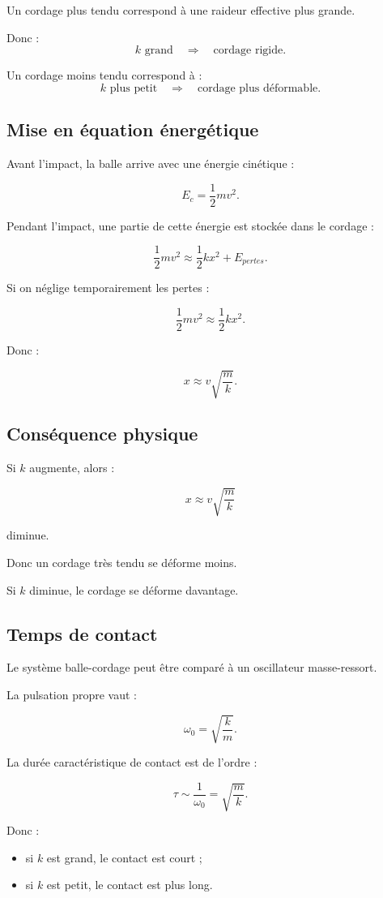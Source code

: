 \documentclass[11pt,a4paper]{article}
\begin{document}
Un cordage plus tendu correspond à une raideur effective plus grande.

Donc :
\[
k \text{ grand} \quad \Rightarrow \quad \text{cordage rigide}.
\]

Un cordage moins tendu correspond à :
\[
k \text{ plus petit} \quad \Rightarrow \quad \text{cordage plus déformable}.
\]

\subsection{Mise en équation énergétique}

Avant l'impact, la balle arrive avec une énergie cinétique :

\[
E_c=\frac12mv^2.
\]

Pendant l'impact, une partie de cette énergie est stockée dans le cordage :

\[
\frac12mv^2 \approx \frac12kx^2 + E_{pertes}.
\]

Si on néglige temporairement les pertes :

\[
\frac12mv^2 \approx \frac12kx^2.
\]

Donc :

\[
x\approx v\sqrt{\frac{m}{k}}.
\]

\subsection{Conséquence physique}

Si $k$ augmente, alors :

\[
x\approx v\sqrt{\frac{m}{k}}
\]

diminue.

Donc un cordage très tendu se déforme moins.

Si $k$ diminue, le cordage se déforme davantage.

\subsection{Temps de contact}

Le système balle-cordage peut être comparé à un oscillateur masse-ressort.

La pulsation propre vaut :

\[
\omega_0=\sqrt{\frac{k}{m}}.
\]

La durée caractéristique de contact est de l'ordre :

\[
\tau \sim \frac{1}{\omega_0}=\sqrt{\frac{m}{k}}.
\]

Donc :
\begin{itemize}
    \item si $k$ est grand, le contact est court ;
    \item si $k$ est petit, le contact est plus long.
\end{itemize}
\end{document}
